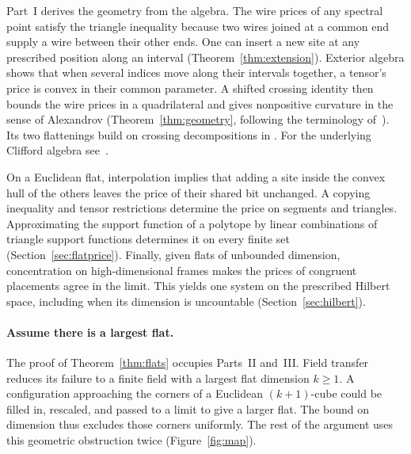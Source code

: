 Part~I derives the geometry from the algebra. The wire prices of any
spectral point satisfy the triangle inequality because two wires joined
at a common end supply a wire between their other ends. One can insert
a new site at any prescribed position along an interval
(Theorem~\ref{thm:extension}). Exterior algebra shows that when several indices move along their
intervals together, a tensor's price is convex in their common
parameter.
A shifted crossing identity then bounds the wire prices in a
quadrilateral and gives nonpositive curvature in the sense of
Alexandrov (Theorem~\ref{thm:geometry}, following the terminology of~\cite{BH}). Its two
flattenings build on crossing decompositions in
\cite{Anthropic,Khoruzhii}. For the underlying Clifford algebra
see~\cite{meinrenken}.

On a Euclidean flat, interpolation implies that adding a site inside
the convex hull of the others leaves the price of their shared bit
unchanged. A copying inequality and tensor restrictions determine the
price on segments and triangles. Approximating the support function of a polytope by
linear combinations of triangle support functions determines it on
every finite set (Section~\ref{sec:flatprice}). Finally, given flats
of unbounded dimension, concentration on high-dimensional frames makes
the prices of congruent placements agree in the limit. This yields one
system on the prescribed Hilbert space, including when its dimension
is uncountable (Section~\ref{sec:hilbert}).

\paragraph{Assume there is a largest flat.}
The proof of Theorem~\ref{thm:flats} occupies Parts~II and~III. Field
transfer reduces its failure to a finite field with a largest flat
dimension \(k\ge1\). A configuration approaching the corners of a
Euclidean \((k+1)\)-cube could be filled in, rescaled, and passed to a
limit to give a larger flat. The bound on dimension thus excludes
those corners uniformly. The rest of the argument uses this geometric
obstruction twice (Figure~\ref{fig:map}).

